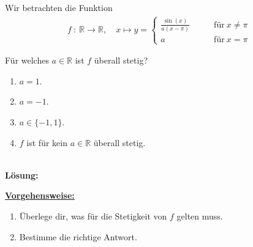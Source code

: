 \newpage

\subsection*{}
Wir betrachten die Funktion
\begin{align*}
f \ : \
\mathbb{R} \to \mathbb{R}, \quad 
x \mapsto
y = 
\begin{cases}
\frac{\sin(x)}{a(x- \pi)} &\qquad \text{für} \ x \neq \pi\\
a &\qquad \text{für} \ x = \pi
\end{cases}
\end{align*}

Für welches $ a \in \mathbb{R} $ ist $ f $ überall stetig?
\renewcommand{\labelenumi}{(\alph{enumi})}
\begin{enumerate}
	\item 
	$ a = 1 $.
	\item
	$ a = -1 $.
	\item
	$ a \in \{ -1, 1\} $.
	\item
	$ f $ ist für kein $ a \in \mathbb{R} $ überall stetig.
\end{enumerate}
\ \\
\textbf{Lösung:}
\begin{mdframed}
\underline{\textbf{Vorgehensweise:}}
\renewcommand{\labelenumi}{\theenumi.}
\begin{enumerate}
\item Überlege dir, was für die Stetigkeit von $ f $ gelten muss.
\item Bestimme die richtige Antwort.
\end{enumerate}
\end{mdframed}

